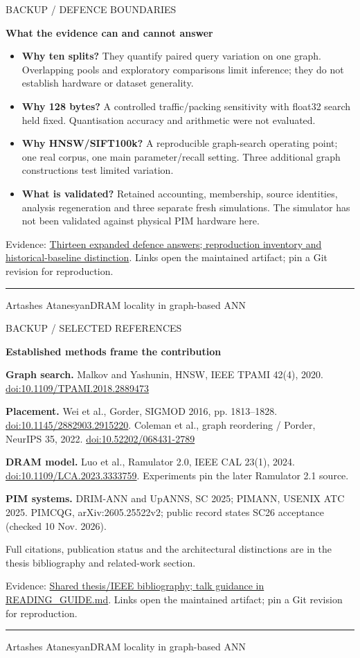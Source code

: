 \documentclass[11pt]{article}
\newenvironment{slide}[2]{%
  \clearpage\color{ink}\fontsize{14}{18}\selectfont
  {\fontsize{10}{12}\selectfont\color{accent}\MakeUppercase{#1}\par}
  {\fontsize{25}{29}\selectfont\bfseries #2\par}\vspace{4pt}
}{%
  \vfill{\color{accent}\hrule}\vspace{4pt}
  {\fontsize{9}{11}\selectfont\color{muted}Artashes Atanesyan\hfill DRAM locality in graph-based ANN\hfill\thepage\par}
}
\newcommand{\evidence}[2]{\vfill{\fontsize{9}{11}\selectfont\color{muted}Evidence: \href{https://github.com/senqx/Thesis-PIM-ANN/blob/main/#1}{#2}. Links open the maintained artifact; pin a Git revision for reproduction.\par}}
\begin{document}
\begin{slide}{Backup / Defence boundaries}{What the evidence can and cannot answer}
\begin{itemize}
\item \textbf{Why ten splits?} They quantify paired query variation on one graph. Overlapping pools and exploratory comparisons limit inference; they do not establish hardware or dataset generality.
\item \textbf{Why 128 bytes?} A controlled traffic/packing sensitivity with float32 search held fixed. Quantisation accuracy and arithmetic were not evaluated.
\item \textbf{Why HNSW/SIFT100k?} A reproducible graph-search operating point; one real corpus, one main parameter/recall setting. Three additional graph constructions test limited variation.
\item \textbf{What is validated?} Retained accounting, membership, source identities, analysis regeneration and three separate fresh simulations. The simulator has not been validated against physical PIM hardware here.
\end{itemize}
\evidence{doc/READING_GUIDE.md}{Thirteen expanded defence answers; reproduction inventory and historical-baseline distinction}
\end{slide}

\begin{slide}{Backup / Selected references}{Established methods frame the contribution}
{\fontsize{12}{16}\selectfont
\textbf{Graph search.} Malkov and Yashunin, HNSW, IEEE TPAMI 42(4), 2020.\newline
\href{https://doi.org/10.1109/TPAMI.2018.2889473}{doi:10.1109/TPAMI.2018.2889473}
\par\textbf{Placement.} Wei et al., Gorder, SIGMOD 2016, pp. 1813--1828.\newline
\href{https://doi.org/10.1145/2882903.2915220}{doi:10.1145/2882903.2915220}. Coleman et al., graph reordering / Porder, NeurIPS 35, 2022.\newline
\href{https://doi.org/10.52202/068431-2789}{doi:10.52202/068431-2789}
\par\textbf{DRAM model.} Luo et al., Ramulator 2.0, IEEE CAL 23(1), 2024.\newline
\href{https://doi.org/10.1109/LCA.2023.3333759}{doi:10.1109/LCA.2023.3333759}. Experiments pin the later Ramulator 2.1 source.
\par\textbf{PIM systems.} DRIM-ANN and UpANNS, SC 2025; PIMANN, USENIX ATC 2025.\newline
PIMCQG, arXiv:2605.25522v2; public record states SC26 acceptance (checked 10 Nov. 2026).
\par Full citations, publication status and the architectural distinctions are in the thesis bibliography and related-work section.\par}
\evidence{doc/references.tex}{Shared thesis/IEEE bibliography; talk guidance in READING\_GUIDE.md}
\end{slide}
\end{document}
